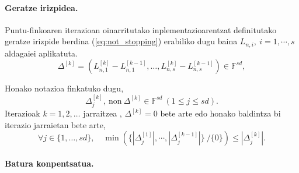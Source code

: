 \paragraph*{Geratze irizpidea.} Puntu-finkoaren iterazioan oinarritutako inplementazioarentzat definitutako geratze irizpide berdina (\ref{eq:not_stopping}) erabiliko dugu baina $L_{n,i}, \ i=1,\cdots,s$ aldagaiei aplikatuta.
\begin{equation*}
\Delta^{[k]}=(L_{n,1}^{[k]}-L_{n,1}^{[k-1]},\dots,L_{n,s}^{[k]}-L_{n,s}^{[k-1]}) \in \mathbb{F}^{sd},
\end{equation*}

Honako notazioa finkatuko dugu,
\begin{equation*}
\Delta_j^{[k]}, \ \text{non} \ \Delta^{[k]} \in \mathbb{F}^{sd}  \ (1\leqslant j \leqslant sd).
\end{equation*}
 Iterazioak  $k=1,2,\ldots$ jarraitzea , $ \Delta^{[k]} =0$ bete arte edo honako baldintza bi iterazio jarraietan bete arte,
\begin{equation}
\label{eq:not_stoppingLi}
\forall j \in \{1,\ldots,s d\},  \quad
\min \left(\{|\Delta_j^{[1]}|,\cdots ,|\Delta_j^{[k-1]}|\} \ /\{0\} \right) \leqslant |\Delta_j^{[k]}|.
\end{equation}


\paragraph*{Batura konpentsatua.}

